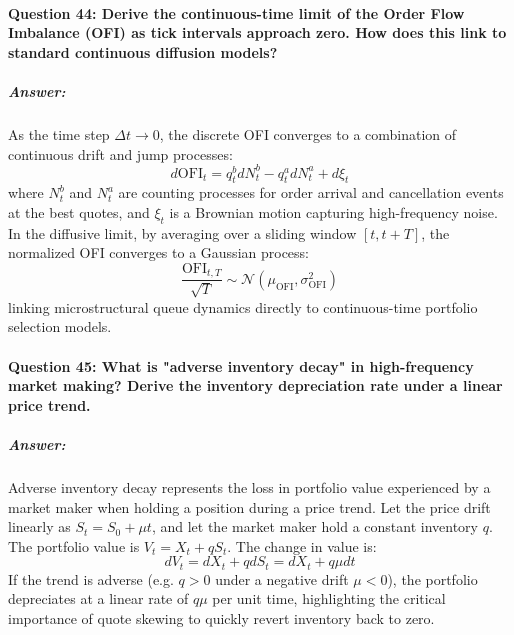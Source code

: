 \documentclass[11pt,a4paper]{article}
\begin{document}
\paragraph{Question 44: Derive the continuous-time limit of the Order Flow Imbalance (OFI) as tick intervals approach zero. How does this link to standard continuous diffusion models?}
\subparagraph{Answer:}
As the time step $\Delta t \to 0$, the discrete OFI converges to a combination of continuous drift and jump processes:
\begin{equation}
    d\text{OFI}_t = q_t^b dN_t^b - q_t^a dN_t^a + d\xi_t
\end{equation}
where $N_t^b$ and $N_t^a$ are counting processes for order arrival and cancellation events at the best quotes, and $\xi_t$ is a Brownian motion capturing high-frequency noise. In the diffusive limit, by averaging over a sliding window $[t, t+T]$, the normalized OFI converges to a Gaussian process:
\begin{equation}
    \frac{\text{OFI}_{t, T}}{\sqrt{T}} \sim \mathcal{N}(\mu_{\text{OFI}}, \sigma_{\text{OFI}}^2)
\end{equation}
linking microstructural queue dynamics directly to continuous-time portfolio selection models.

\paragraph{Question 45: What is "adverse inventory decay" in high-frequency market making? Derive the inventory depreciation rate under a linear price trend.}
\subparagraph{Answer:}
Adverse inventory decay represents the loss in portfolio value experienced by a market maker when holding a position during a price trend. Let the price drift linearly as $S_t = S_0 + \mu t$, and let the market maker hold a constant inventory $q$. The portfolio value is $V_t = X_t + q S_t$. The change in value is:
\begin{equation}
    dV_t = dX_t + q dS_t = dX_t + q \mu dt
\end{equation}
If the trend is adverse (e.g. $q > 0$ under a negative drift $\mu < 0$), the portfolio depreciates at a linear rate of $q \mu$ per unit time, highlighting the critical importance of quote skewing to quickly revert inventory back to zero.
\end{document}
